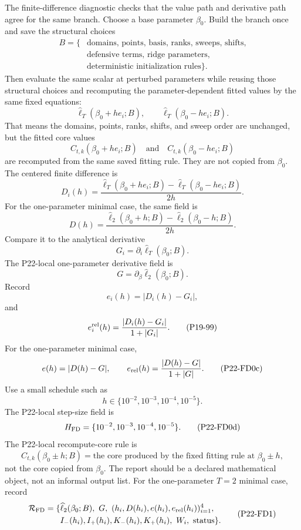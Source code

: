 \documentclass[11pt]{article}
\newcommand{\widehatell}{\widehat\ell}
\begin{document}
The finite-difference diagnostic checks that the value path and derivative path agree
for the same branch.  Choose a base parameter \(\beta_0\).  Build the branch
once and save the structural choices
\[
    \begin{aligned}
    B=\{&
    \text{domains, points, basis, ranks, sweeps, shifts,}\\
    &\text{defensive terms, ridge parameters,}\\
    &\text{deterministic initialization rules}\}.
    \end{aligned}
    \tag{P19-94}
\]
Then evaluate the same scalar at perturbed parameters while reusing those
structural choices and recomputing the parameter-dependent fitted values by the
same fixed equations:
\[
    \widehatell_T(\beta_0+h e_i;B),
    \qquad
    \widehatell_T(\beta_0-h e_i;B).
    \tag{P19-95}
\]
That means the domains, points, ranks, shifts, and sweep order are unchanged,
but the fitted core values
\[
    C_{t,k}(\beta_0+h e_i;B)
    \quad\text{and}\quad
    C_{t,k}(\beta_0-h e_i;B)
    \tag{P19-95a}
\]
are recomputed from the same saved fitting rule.  They are not copied from
\(\beta_0\).
The centered finite difference is
\[
    D_i(h)
    =
    \frac{
    \widehatell_T(\beta_0+h e_i;B)
    -
    \widehatell_T(\beta_0-h e_i;B)}
    {2h}.
    \tag{P19-96}
\]
For the one-parameter minimal case, the same field is
\[
    D(h)
    =
    \frac{
    \widehatell_2(\beta_0+h;B)
    -
    \widehatell_2(\beta_0-h;B)}
    {2h}.
    \tag{P22-FD0a}
\]
Compare it to the analytical derivative
\[
    G_i=\partial_i\widehatell_T(\beta_0;B).
    \tag{P19-97}
\]
The P22-local one-parameter derivative field is
\[
    G=\partial_\beta\widehatell_2(\beta_0;B).
    \tag{P22-FD0b}
\]
Record
\[
    e_i(h)=|D_i(h)-G_i|,
    \tag{P19-98}
\]
and
\[
    e_i^{\rm rel}(h)
    =
    \frac{|D_i(h)-G_i|}{1+|G_i|}.
    \tag{P19-99}
\]
For the one-parameter minimal case,
\[
    e(h)=|D(h)-G|,
    \qquad
    e_{\rm rel}(h)=\frac{|D(h)-G|}{1+|G|}.
    \tag{P22-FD0c}
\]
Use a small schedule such as
\[
    h\in\{10^{-2},10^{-3},10^{-4},10^{-5}\}.
    \tag{P19-100}
\]
The P22-local step-size field is
\[
    H_{\rm FD}=\{10^{-2},10^{-3},10^{-4},10^{-5}\}.
    \tag{P22-FD0d}
\]
The P22-local recompute-core rule is
\[
    C_{t,k}(\beta_0\pm h;B)
    =
    \text{the core produced by the fixed fitting rule at }\beta_0\pm h,
    \tag{P22-FD0e}
\]
not the core copied from \(\beta_0\).
The report should be a declared mathematical object, not an informal output
list.
For the one-parameter \(T=2\) minimal case, record
\[
\begin{aligned}
    \mathcal R_{\rm FD}
    =
    \{&
    \widehatell_2(\beta_0;B),\
    G,\
    (h_i,D(h_i),e(h_i),e_{\rm rel}(h_i))_{i=1}^{4},\\
    &I_-(h_i),I_+(h_i),K_-(h_i),K_+(h_i),\
    W_i,\ \text{status}\}.
\end{aligned}
\tag{P22-FD1}
\]
\end{document}
